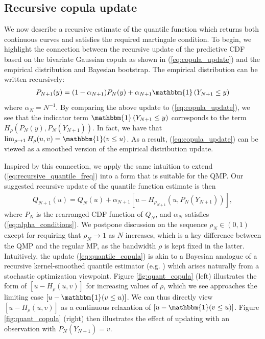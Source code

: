 \documentclass[11pt,a4paper]{article}
\begin{document}
\subsection{Recursive copula update}
We now describe a recursive estimate of the quantile function which returns both continuous curves and satisfies the required martingale condition. To begin, we highlight the connection between the recursive update of the predictive CDF based on the bivariate Gaussian copula as shown in (\ref{eq:copula_update}) and the empirical distribution and Bayesian bootstrap. The empirical distribution can be written recursively:
\begin{align*}
    P_{N+1}(y) = (1-\alpha_{N+1})P_N(y) + \alpha_{N+1}\mathbbm{1}\left(Y_{N+1} \leq y\right)
\end{align*}
where $\alpha_{N} = N^{-1}$. By comparing the above update to (\ref{eq:copula_update}), we see that the indicator term $\mathbbm{1}\left(Y_{N+1} \leq y\right)$ corresponds to the term $H_\rho\left(P_N(y), P_N(Y_{N+1})\right)$. In fact, we have that $\lim_{\rho \to 1} H_\rho(u,v) = \mathbbm{1}(v \leq u)$.
As a result, (\ref{eq:copula_update}) can be viewed as a smoothed version of the empirical distribution update.

Inspired by this connection, we apply the same intuition to extend (\ref{eq:recursive_quantile_freq}) into a form that is suitable for the QMP. Our suggested recursive update of the quantile function estimate is then
\begin{align}\label{eq:quantile_copula}
    Q_{N+1}(u) = Q_N(u) + \alpha_{N+1}\left[u - H_{\rho_{N+1}}\left(u, P_N(Y_{N+1})\right)\right],
\end{align}
where $P_N$ is the rearranged CDF function of $Q_N$, and $\alpha_N$ satisfies (\ref{eq:alpha_conditions}). We postpone discussion on the sequence $\rho_N \in (0,1)$ except for requiring that $\rho_N \to 1$ as $N$ increases, which is a key difference between the QMP and the regular MP, as the bandwidth $\rho$ is kept fixed in the latter.
Intuitively, the update (\ref{eq:quantile_copula}) is akin to a Bayesian analogue of a recursive kernel-smoothed quantile estimator (e.g. \cite{Aboubacar2014}) which arises naturally from a stochastic optimization viewpoint.
 {Figure \ref{fig:quant_copula} (left)} illustrates the form of $[u - H_\rho(u,v)]$ for increasing values of $\rho$, which we see approaches the limiting case $[u-\mathbbm{1}(v \leq u)]$. We can thus directly view $[u - H_\rho(u,v)]$ as a continuous relaxation of $[u-\mathbbm{1}(v \leq u)]$. {Figure \ref{fig:quant_copula} (right)} then illustrates the effect of updating with an observation with $P_N(Y_{N+1}) = v$.
\end{document}

